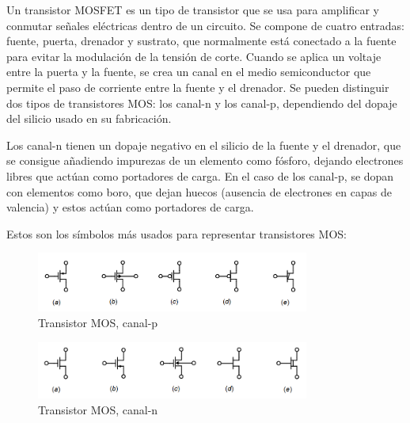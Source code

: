\documentclass[12pt]{report} %
\begin{document}
	
	Un transistor MOSFET es un tipo de transistor que se usa para amplificar y conmutar señales eléctricas dentro de un circuito. Se compone de cuatro entradas: fuente, puerta, drenador y sustrato, que normalmente está conectado a la fuente para evitar la modulación de la tensión de corte. Cuando se aplica un voltaje entre la puerta y la fuente, se crea un canal en el medio semiconductor que permite el paso de corriente entre la fuente y el drenador. Se pueden distinguir dos tipos de transistores MOS: los canal-n y los canal-p, dependiendo del dopaje del silicio usado en su fabricación. 
	
	Los canal-n tienen un dopaje negativo en el silicio de la fuente y el drenador, que se consigue añadiendo impurezas de un elemento como fósforo, dejando electrones libres que actúan como portadores de carga. En el caso de los canal-p, se dopan con elementos como boro, que dejan huecos (ausencia de electrones en capas de valencia) y estos actúan como portadores de carga.
	
	Estos son los símbolos más usados para representar transistores MOS:
	
	\begin{figure}[H]
		\includegraphics[width=0.8\textwidth]{p-mos-symbol.png}
		\caption[Transistor MOS, canal-p]{Transistor MOS, canal-p\protect\footnotemark}
		\label{fig:p-mos-symbol.png}
	\end{figure}

	
	\begin{figure}[H]
		\includegraphics[width=0.8\textwidth]{n-mos-symbol.png}
		\caption[Transistor MOS, canal-n]{Transistor MOS, canal-n\protect\footnotemark}
		\label{fig:n-mos-symbol.png}
	\end{figure}

\end{document}
